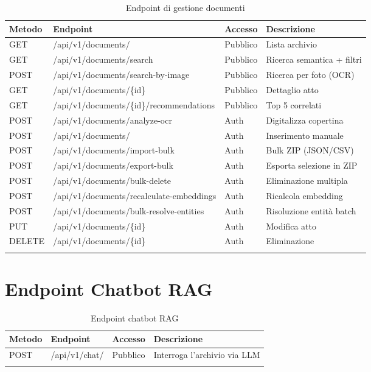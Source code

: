 \documentclass[12pt,a4paper,oneside]{report}
\begin{document}
\begin{longtable}{>{\ttfamily\small}p{1.5cm} >{\ttfamily\small}p{7.5cm} p{2cm} p{3cm}}
    \toprule
    \normalfont\textbf{Metodo} & \normalfont\textbf{Endpoint} &
    \normalfont\textbf{Accesso} & \normalfont\textbf{Descrizione} \\
    \midrule
    \endhead
    GET  & /api/v1/documents/ & Pubblico & Lista archivio \\
    GET  & /api/v1/documents/search & Pubblico & Ricerca semantica + filtri \\
    POST & /api/v1/documents/search-by-image & Pubblico & Ricerca per foto (OCR) \\
    GET  & /api/v1/documents/\{id\} & Pubblico & Dettaglio atto \\
    GET  & /api/v1/documents/\{id\}/recommendations & Pubblico & Top 5 correlati \\
    POST & /api/v1/documents/analyze-ocr & Auth & Digitalizza copertina \\
    POST & /api/v1/documents/ & Auth & Inserimento manuale \\
    POST & /api/v1/documents/import-bulk & Auth & Bulk ZIP (JSON/CSV) \\
    POST & /api/v1/documents/export-bulk & Auth & Esporta selezione in ZIP \\
    POST & /api/v1/documents/bulk-delete & Auth & Eliminazione multipla \\
    POST & /api/v1/documents/recalculate-embeddings & Auth & Ricalcola embedding \\
    POST & /api/v1/documents/bulk-resolve-entities & Auth & Risoluzione entit\`{a} batch \\
    PUT  & /api/v1/documents/\{id\} & Auth & Modifica atto \\
    DELETE & /api/v1/documents/\{id\} & Auth & Eliminazione \\
    \bottomrule
    \caption{Endpoint di gestione documenti}
\end{longtable}

\section{Endpoint Chatbot RAG}

\begin{longtable}{>{\ttfamily\small}p{1.5cm} >{\ttfamily\small}p{7.5cm} p{2cm} p{3.2cm}}
    \toprule
    \normalfont\textbf{Metodo} & \normalfont\textbf{Endpoint} &
    \normalfont\textbf{Accesso} & \normalfont\textbf{Descrizione} \\
    \midrule
    \endhead
    POST & /api/v1/chat/ & Pubblico & Interroga l'archivio via LLM \\
    \bottomrule
    \caption{Endpoint chatbot RAG}
\end{longtable}
\end{document}
